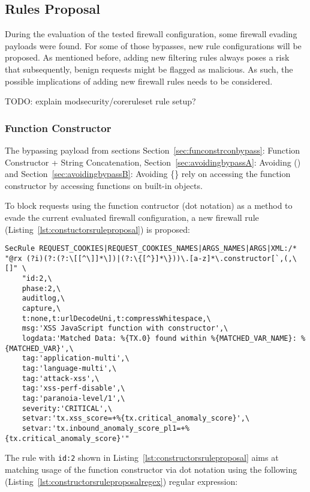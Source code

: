 \subsection{Rules Proposal}
\label{sec:rulesproposal}
During the evaluation of the tested firewall configuration, some firewall evading payloads were found. For some of those bypasses, new rule configurations will be proposed. As mentioned before, adding new filtering rules always poses a risk that subsequently, benign requests might be flagged as malicious. As such, the possible implications of adding new firewall rules needs to be considered.

	{\color{red} TODO: explain modsecurity/coreruleset rule setup?}

\subsubsection{Function Constructor}
\label{sec:rulespropfunctionconstructor}
The bypassing payload from sections Section~\ref{sec:funconstrconbypass}: Function Constructor + String Concatenation, Section~\ref{sec:avoidingbypassA}: Avoiding () and Section~\ref{sec:avoidingbypassB}: Avoiding \{\} rely on accessing the function constructor by accessing functions on built-in objects.

To block requests using the function contructor (dot notation) as a method to evade the current evaluated firewall configuration, a new firewall rule (Listing~\ref{lst:constuctorsruleproposal}) is proposed:

\begin{lstlisting}[style=basicStyle, caption=rule proposal to block usage of function constructor via dot notation, label={lst:constructorsruleproposal}]
SecRule REQUEST_COOKIES|REQUEST_COOKIES_NAMES|ARGS_NAMES|ARGS|XML:/* "@rx (?i)(?:(?:\[[^\]]*\])|(?:\{[^}]*\}))\.[a-z]*\.constructor[`,(,\[]" \
    "id:2,\
    phase:2,\
    auditlog,\
    capture,\
    t:none,t:urlDecodeUni,t:compressWhitespace,\
    msg:'XSS JavaScript function with constructor',\
    logdata:'Matched Data: %{TX.0} found within %{MATCHED_VAR_NAME}: %{MATCHED_VAR}',\
    tag:'application-multi',\
    tag:'language-multi',\
    tag:'attack-xss',\
    tag:'xss-perf-disable',\
    tag:'paranoia-level/1',\
    severity:'CRITICAL',\
    setvar:'tx.xss_score=+%{tx.critical_anomaly_score}',\
    setvar:'tx.inbound_anomaly_score_pl1=+%{tx.critical_anomaly_score}'"
\end{lstlisting}

The rule with \verb|id:2| shown in Listing~\ref{lst:constructorsruleproposal} aims at matching usage of the function constructor via dot notation using the following (Listing~\ref{lst:constructorsruleproposalregex}) regular expression:

